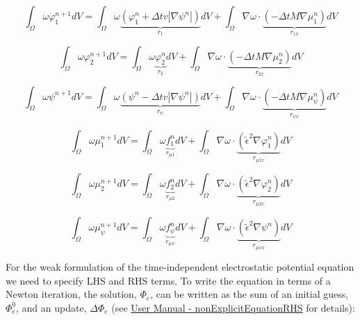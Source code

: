 \documentclass[11pt]{article}
\begin{document}
\begin{equation} \label{phi1_weak}
\int_\Omega \omega \varphi^{n+1}_1dV = \int_\Omega \omega\underbrace{\left(\varphi^{n}_1+\Delta tv|\nabla\psi^n|\right)}_{r_1}dV + \int_\Omega \nabla\omega\cdot\underbrace{\left(-\Delta t M\nabla\mu^{n}_1\right)}_{r_{1 x}}dV
\end{equation}

\begin{equation} \label{phi2_weak}
\int_\Omega \omega \varphi^{n+1}_2dV = \int_\Omega \omega\underbrace{\varphi^n_2}_{r_2}dV + \int_\Omega \nabla\omega\cdot\underbrace{\left(-\Delta t M\nabla\mu^{n}_2\right)}_{r_{2x}}dV
\end{equation}

\begin{equation} \label{psi_weak}
\int_\Omega \omega \psi^{n+1}dV = \int_\Omega \omega\underbrace{\left(\psi^n-\Delta tv|\nabla\psi^n|\right)}_{r_{\psi}}dV + \int_\Omega \nabla\omega\cdot\underbrace{\left(-\Delta t M\nabla\mu^n_{\psi}\right)}_{r_{\psi x}}dV
\end{equation}

\begin{equation} \label{mu1_weak}
\int_\Omega \omega\mu^{n+1}_1dV = \int_\Omega \omega \underbrace{f^n_1}_{r_{\mu 1}} dV +\int_\Omega \nabla\omega\cdot\underbrace{\left(\widetilde{\epsilon}^2\nabla\varphi^n_1\right)}_{r_{\mu 1 x}}dV
\end{equation}

\begin{equation} \label{mu2_weak}
\int_\Omega \omega\mu^{n+1}_2dV = \int_\Omega \omega \underbrace{f^n_2}_{r_{\mu 2}} dV +\int_\Omega \nabla\omega\cdot\underbrace{\left(\widetilde{\epsilon}^2\nabla\varphi^n_2\right)}_{r_{\mu 2 x}}dV
\end{equation}

\begin{equation} \label{mu_psi_weak}
\int_\Omega \omega\mu^{n+1}_{\psi}dV = \int_\Omega \omega \underbrace{f^n_{\psi}}_{r_{\mu\psi}} dV +\int_\Omega \nabla\omega\cdot\underbrace{\left(\widetilde{\epsilon}^2\nabla\psi^n\right)}_{r_{\mu\psi x}}dV
\end{equation}

For the weak formulation of the time-independent electrostatic potential equation  we need to specify LHS and RHS terms. To write the equation in terms of a Newton iteration, the solution, $\Phi_e$, can be written as the sum of an initial guess, $\Phi^0_e$, and an update, $\Delta \Phi_e$ (see \href{https://prisms-center.github.io/phaseField/doxygen_files/app_files.html}{User Manual - nonExplicitEquationRHS} for details):
\end{document}
